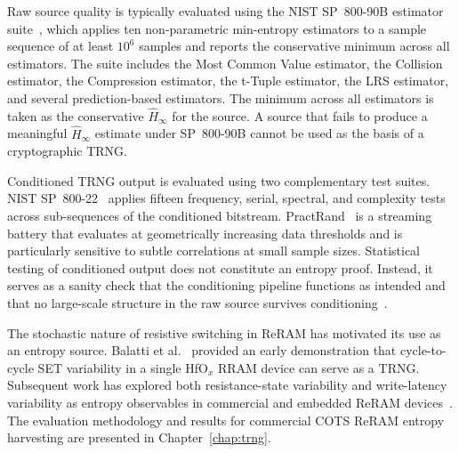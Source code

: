Raw source quality is typically evaluated using the NIST SP~800-90B
estimator suite~\cite{sonmez2016recommendation}, which applies ten
non-parametric min-entropy estimators to a sample sequence of at least
$10^6$ samples and reports the conservative minimum across all
estimators. The suite includes the Most Common Value estimator, the
Collision estimator, the Compression estimator, the t-Tuple estimator,
the LRS estimator, and several prediction-based estimators. The minimum
across all estimators is taken as the conservative $\hat{H}_\infty$ for
the source. A source that fails to produce a meaningful $\hat{H}_\infty$
estimate under SP~800-90B cannot be used as the basis of a cryptographic
TRNG.

Conditioned TRNG output is evaluated using two complementary test
suites. NIST SP~800-22~\cite{rukhin2001statistical} applies fifteen
frequency, serial, spectral, and complexity tests across sub-sequences
of the conditioned bitstream. PractRand~\cite{practrand} is a streaming
battery that evaluates at geometrically increasing data thresholds and
is particularly sensitive to subtle correlations at small sample sizes.
Statistical testing of conditioned output does not constitute an entropy
proof. Instead, it serves as a sanity check that the conditioning
pipeline functions as intended and that no large-scale structure in the
raw source survives conditioning~\cite{sonmez2016recommendation}.

The stochastic nature of resistive switching in ReRAM has motivated its
use as an entropy source. Balatti et al.~\cite{balatti2015true} provided
an early demonstration that cycle-to-cycle SET variability in a single
HfO$_x$ RRAM device can serve as a TRNG. Subsequent work has explored
both resistance-state variability and write-latency variability as
entropy observables in commercial and embedded ReRAM
devices~\cite{suri2018high, pang2019memristors, tolga2024trng}. The
evaluation methodology and results for commercial COTS ReRAM entropy
harvesting are presented in Chapter~\ref{chap:trng}.